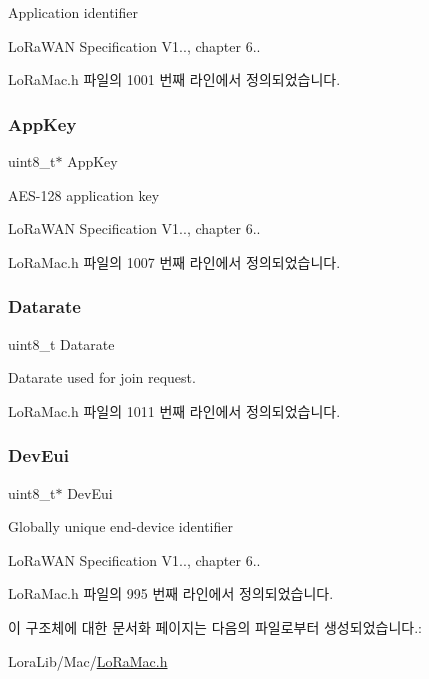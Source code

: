 Application identifier

Lo\+Ra\+W\+AN Specification V1.., chapter 6.. 

Lo\+Ra\+Mac.\+h 파일의 1001 번째 라인에서 정의되었습니다.

\mbox{\label{structs_mlme_req_join_a560c2bd9214ee75105acac8593614bd9}} 
\subsubsection{\texorpdfstring{App\+Key}{AppKey}}
{\footnotesize\ttfamily uint8\+\_\+t$\ast$ App\+Key}

A\+E\+S-\/128 application key

Lo\+Ra\+W\+AN Specification V1.., chapter 6.. 

Lo\+Ra\+Mac.\+h 파일의 1007 번째 라인에서 정의되었습니다.

\mbox{\label{structs_mlme_req_join_a780280c12645b2666878162aab5d8cad}} 
\subsubsection{\texorpdfstring{Datarate}{Datarate}}
{\footnotesize\ttfamily uint8\+\_\+t Datarate}

Datarate used for join request. 

Lo\+Ra\+Mac.\+h 파일의 1011 번째 라인에서 정의되었습니다.

\mbox{\label{structs_mlme_req_join_a2aa72c6d37233b51e7ae46f85398f888}} 
\subsubsection{\texorpdfstring{Dev\+Eui}{DevEui}}
{\footnotesize\ttfamily uint8\+\_\+t$\ast$ Dev\+Eui}

Globally unique end-\/device identifier

Lo\+Ra\+W\+AN Specification V1.., chapter 6.. 

Lo\+Ra\+Mac.\+h 파일의 995 번째 라인에서 정의되었습니다.



이 구조체에 대한 문서화 페이지는 다음의 파일로부터 생성되었습니다.\+:\begin{DoxyCompactItemize}
\item 
Lora\+Lib/\+Mac/\mbox{\hyperlink{_lo_ra_mac_8h}{Lo\+Ra\+Mac.\+h}}\end{DoxyCompactItemize}
